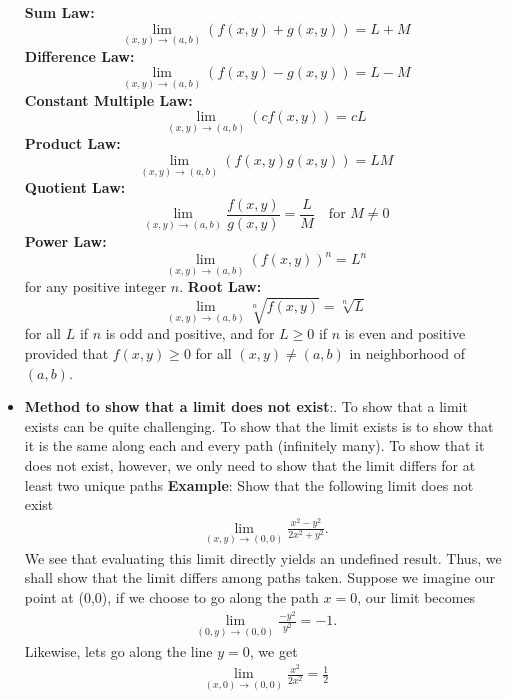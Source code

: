 \documentclass{report}
\begin{document}
\begin{itemize}
\[            \]
            \textbf{Sum Law:}
            \[
                \lim_{(x,y) \to (a,b)} (f(x,y) + g(x,y)) = L + M \tag{4.5}
            \]
            \textbf{Difference Law:}
            \[
                \lim_{(x,y) \to (a,b)} (f(x,y) - g(x,y)) = L - M \tag{4.6}
            \]
            \textbf{Constant Multiple Law:}
            \[
                \lim_{(x,y) \to (a,b)} (cf(x,y)) = cL \tag{4.7}
            \]
            \textbf{Product Law:}
            \[
                \lim_{(x,y) \to (a,b)} (f(x,y)g(x,y)) = LM \tag{4.8}
            \]
            \textbf{Quotient Law:}
            \[
                \lim_{(x,y) \to (a,b)} \frac{f(x,y)}{g(x,y)} = \frac{L}{M} \quad \text{for } M \neq 0 \tag{4.9}
            \]
            \textbf{Power Law:}
            \[
                \lim_{(x,y) \to (a,b)} (f(x,y))^n = L^n \tag{4.10}
            \]
            for any positive integer $n$.
            \textbf{Root Law:}
            \[
                \lim_{(x,y) \to (a,b)} \sqrt[n]{f(x,y)} = \sqrt[n]{L} \tag{4.11}
            \]
            for all $L$ if $n$ is odd and positive, and for $L \geq 0$ if $n$ is even and positive provided that $f(x, y) \geq 0$ for all $(x, y) \neq (a, b)$ in neighborhood of $(a, b)$.
        \item \textbf{Method to show that a limit does not exist}:. To show that a limit exists can be quite challenging. To show that the limit exists is to show that it is the same along each and every path (infinitely many). To show that it does not exist, however, we only need to show that the limit differs for at least two unique paths
            \bigbreak \noindent 
            \textbf{Example}: Show that the following limit does not exist
            \begin{align*}
                \lim\limits_{(x,y) \to (0,0)}{\frac{x^{2}-y^{2}}{2x^{2} + y^{2}}}
            .\end{align*}
                We see that evaluating this limit directly yields an undefined result. Thus, we shall show that the limit differs among paths taken. Suppose we imagine our point at (0,0), if we choose to go along the path $x=0$, our limit becomes
                \begin{align*}
                    \lim\limits_{(0,y) \to (0,0)}{\frac{-y^{2}}{y^{2}}} = -1
                .\end{align*}
                Likewise, lets go along the line $y=0$, we get
                \begin{align*}
                    \lim\limits_{(x,0) \to (0,0)}{\frac{x^{2}}{2x^{2}}} = \frac{1}{2}

\end{align*}
\end{itemize}
\end{document}
